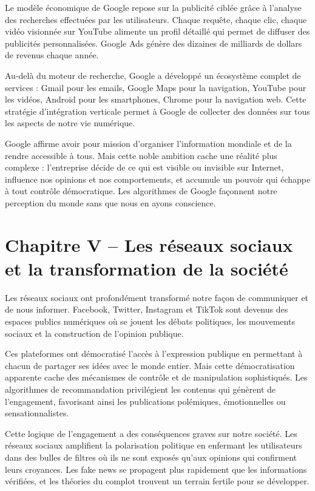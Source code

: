 \documentclass[12pt,a4paper]{article}
\begin{document}
Le modèle économique de Google repose sur la publicité ciblée grâce à l'analyse des recherches effectuées par les utilisateurs. Chaque requête, chaque clic, chaque vidéo visionnée sur YouTube alimente un profil détaillé qui permet de diffuser des publicités personnalisées. Google Ads génère des dizaines de milliards de dollars de revenus chaque année.

Au-delà du moteur de recherche, Google a développé un écosystème complet de services : Gmail pour les emails, Google Maps pour la navigation, YouTube pour les vidéos, Android pour les smartphones, Chrome pour la navigation web. Cette stratégie d'intégration verticale permet à Google de collecter des données sur tous les aspects de notre vie numérique.

Google affirme avoir pour mission d'organiser l'information mondiale et de la rendre accessible à tous. Mais cette noble ambition cache une réalité plus complexe : l'entreprise décide de ce qui est visible ou invisible sur Internet, influence nos opinions et nos comportements, et accumule un pouvoir qui échappe à tout contrôle démocratique. Les algorithmes de Google façonnent notre perception du monde sans que nous en ayons conscience.

\newpage

\section*{Chapitre V -- Les réseaux sociaux et la transformation de la société}

Les réseaux sociaux ont profondément transformé notre façon de communiquer et de nous informer. Facebook, Twitter, Instagram et TikTok sont devenus des espaces publics numériques où se jouent les débats politiques, les mouvements sociaux et la construction de l'opinion publique.

Ces plateformes ont démocratisé l'accès à l'expression publique en permettant à chacun de partager ses idées avec le monde entier. Mais cette démocratisation apparente cache des mécanismes de contrôle et de manipulation sophistiqués. Les algorithmes de recommandation privilégient les contenus qui génèrent de l'engagement, favorisant ainsi les publications polémiques, émotionnelles ou sensationnalistes.

Cette logique de l'engagement a des conséquences graves sur notre société. Les réseaux sociaux amplifient la polarisation politique en enfermant les utilisateurs dans des bulles de filtres où ils ne sont exposés qu'aux opinions qui confirment leurs croyances. Les fake news se propagent plus rapidement que les informations vérifiées, et les théories du complot trouvent un terrain fertile pour se développer.
\end{document}
